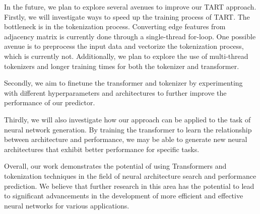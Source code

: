 \documentclass{article}
\begin{document}
In the future, we plan to explore several avenues to improve our TART approach. Firstly, we will investigate ways to speed up the training process of TART. The bottleneck is in the tokenization process. Converting edge features from adjacency matrix is currently done through a single-thread for-loop. One possible avenue is to preprocess the input data and vectorize the tokenization process, which is currently not. Additionally, we plan to explore the use of multi-thread tokenizers and longer training times for both the tokenizer and transformer.

Secondly, we aim to finetune the transformer and tokenizer by experimenting with different hyperparameters and architectures to further improve the performance of our predictor.

Thirdly, we will also investigate how our approach can be applied to the task of neural network generation. By training the transformer to learn the relationship between architecture and performance, we may be able to generate new neural architectures that exhibit better performance for specific tasks.

Overall, our work demonstrates the potential of using Transformers and tokenization techniques in the field of neural architecture search and performance prediction. We believe that further research in this area has the potential to lead to significant advancements in the development of more efficient and effective neural networks for various applications.










\end{document}
